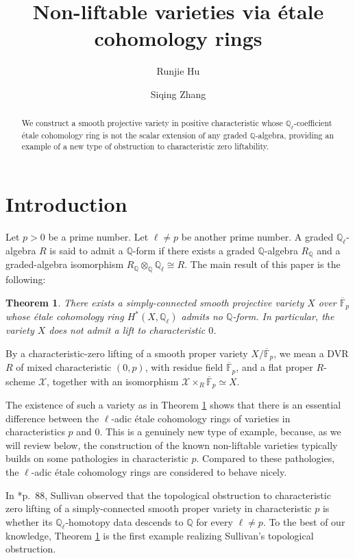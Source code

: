 \documentclass[11pt, reqno]{amsart}
\title{Non-liftable varieties via \'etale cohomology rings}
\author{Runjie Hu}
\author{Siqing Zhang}
\date{}
\newtheorem{theorem}{Theorem}[section]
\theoremstyle{definition}
\newcommand\QQ{\mathbb{Q}}
\newcommand\FF{\mathbb{F}}
\begin{document}
\begin{abstract}
    We construct a smooth projective variety in positive characteristic whose $\mathbb{Q}_{\ell}$-coefficient \'etale cohomology ring is not the scalar extension of any graded $\QQ$-algebra, providing an example of a new type of obstruction to characteristic zero liftability.
\end{abstract}

\maketitle


\section*{Introduction}

Let $p>0$ be a prime number. Let $\ell\neq p$ be another prime number.
A graded $\QQ_\ell$-algebra $R$ is said to admit a $\QQ$-form if there
exists a graded $\QQ$-algebra $R_{\QQ}$ and a graded-algebra isomorphism $R_{\QQ}\otimes_{\QQ}\QQ_\ell\cong R$.
The main result of this paper is the following:

\begin{theorem}\label{thm:main-intro}
    There exists a simply-connected smooth projective variety $X$ over $\overline{\FF}_p$ whose \'etale cohomology ring $H^*(X,\QQ_{\ell})$ admits no $\QQ$-form.
In particular, the variety $X$ does not admit a lift to characteristic $0$.
\end{theorem}

By a characteristic-zero lifting of a smooth proper variety
$X/\overline{\FF}_p$, we mean a DVR $R$ of mixed characteristic $(0,p)$, with
residue field $\overline{\FF}_p$, and a flat proper $R$-scheme $\mathcal X$, together with an isomorphism
$\mathcal X\times_R\overline{\FF}_p \simeq X$.

The existence of such a variety as in Theorem \ref{thm:main-intro} shows that there is an essential difference between the $\ell$-adic \'etale cohomology rings of varieties in characteristics $p$ and $0$.  This is a genuinely new type of example, because, as we will review below, the construction of the known non-liftable varieties typically builds on some pathologies in characteristic $p$.
Compared to these pathologies, the $\ell$-adic \'etale cohomology rings are considered to behave nicely. 

In \cite{Sullivan-MIT-notes}*{p.~88}, Sullivan observed that the topological obstruction to characteristic zero lifting of a simply-connected smooth proper variety in characteristic $p$ is whether its $\QQ_{\ell}$-homotopy data descends to $\QQ$ for every $\ell\neq p$. To the best of our knowledge, Theorem \ref{thm:main-intro} is the first example realizing Sullivan's topological obstruction.
\end{document}
